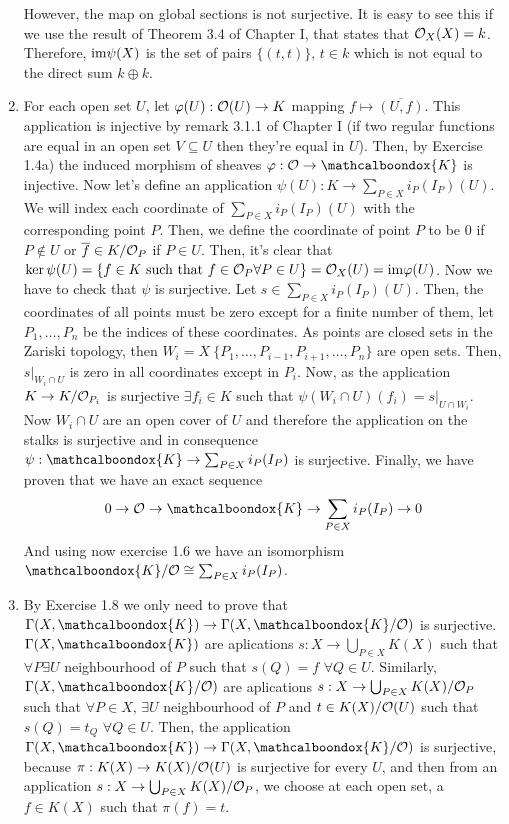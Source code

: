 \begin{sol}
\begin{enumerate}[label = \alph*)]
		However, the map on global sections is not surjective. It is easy to see this if we use the result of Theorem 3.4 of Chapter I, that states that $\mathcal{O}_X(X) = k$. Therefore, $\mathrm{im} \psi(X)$ is the set of pairs $\{(t,t)\}, \, t \in k$ which is not equal to the direct sum $k \oplus k$.

		\item For each open set $U$, let $\varphi(U): \mathcal{O}(U) \to K$ mapping $f \mapsto \overline{(U,f)}$. This application is injective by remark 3.1.1 of Chapter I (if two regular functions are equal in an open set $V \subseteq U$ then they're equal in $U$). Then, by Exercise 1.4a) the induced morphism of sheaves $\varphi: \locO \to \mathcalboondox{K}$ is injective. Now let's define an application $\psi(U): K \to \sum_{P \in X} i_P(I_P)(U)$. We will index each coordinate of $\sum_{P \in X} i_P(I_P)(U)$ with the corresponding point $P$. Then, we define the coordinate of point $P$ to be 0 if $P \notin U$ or $\overline{f} \in K/\mathcal{O}_P$ if $P \in U$. Then, it's clear that $\ker \psi(U) = \{f \in K \text{ such that } f \in \mathcal{O}_P \forall P \in U\} = \mathcal{O}_X(U)= \mathrm{im} \varphi(U)$. Now we have to check that $\psi$ is surjective. Let $s \in \sum_{P \in X} i_P(I_P) (U)$. Then, the coordinates of all points must be zero except for a finite number of them, let $P_1, \dots, P_n$ be the indices of these coordinates. As points are closed sets in the Zariski topology, then $W_i = X \ \{P_1, \dots, P_{i-1}, P_{i+1}, \dots, P_n \}$ are open sets. Then, $s|_{W_i \cap U}$ is zero in all coordinates except in $P_i$. Now, as the application $K \to K/\mathcal{O}_{P_i}$ is surjective $\exists f_i \in K$ such that $\psi(W_i \cap U)(f_i) = s|_{U \cap W_i}$. Now $W_i \cap U$ are an open cover of $U$ and therefore the application on the stalks is surjective and in consequence $\psi: \mathcalboondox{K} \to \sum_{P \in X} i_P(I_P)$ is surjective. Finally, we have proven that we have an exact sequence 
		\[
			0 \to \locO \to \mathcalboondox{K} \to \sum_{P \in X}i_P(I_P) \to 0
		\]
		And using now exercise 1.6 we have an isomorphism $\mathcalboondox{K}/\locO \cong \sum_{P \in X}i_P(I_P)$.

		\item By Exercise 1.8 we only need to prove that $\Gamma(X, \mathcalboondox{K}) \to \Gamma(X, \mathcalboondox{K}/\locO)$ is surjective. $\Gamma(X, \mathcalboondox{K})$ are aplications $s: X \to \bigcup_{P \in X} K(X)$ such that $\forall P \exists U$ neighbourhood of $P$ such that $s(Q) = f$ $\forall Q \in U$. Similarly, $\Gamma(X, \mathcalboondox{K}/\locO)$ are aplications $s: X \to \bigcup_{P \in X} K(X)/\mathcal{O}_P$ such that $\forall P \in X, \, \exists U$ neighbourhood of $P$ and $t \in K(X)/\mathcal{O}(U)$ such that $s(Q) = t_Q$ $\forall Q \in U$. Then, the application $\Gamma(X, \mathcalboondox{K}) \to \Gamma(X, \mathcalboondox{K}/\locO)$ is surjective, because $\pi: K(X) \to K(X)/\mathcal{O}(U)$ is surjective for every $U$, and then from an application $s: X \to \bigcup_{P \in X} K(X)/\mathcal{O}_P$, we choose at each open set, a $f \in K(X)$ such that $\pi(f) = t$.
	\end{enumerate}
\end{sol}


